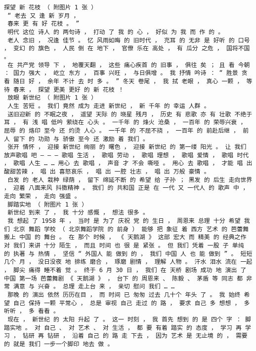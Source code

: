 \documentclass{article}
\begin{document}
\begin{Verbatim}[commandchars=\\\{\}]
 探望 新 花枝 （ 附图片 1 张 ） 
 “ 老去 又 逢 新 岁月 ， 
 春来 更 有 好 花枝 。 ” 
 明代 这位 诗人 的 两句诗 ， 打动 了 我 的 心 ， 好似 为 我 而 作 的 。 
 老人 念旧 ， 况逢 佳节 。 忆 风雨如晦 的 旧时代 ， 充耳 的 无非 是 好听 的 口号 ， 变幻 的 旗色 ， 人民 倒 在 地下 ， 官僚 乐在 高处 ， 有 瓜分 之危 ， 国将不国 。 
 在 共产党 领导 下 ， 地覆天翻 ， 这些 痛心疾首 的 旧事 ， 俱往 矣 ； 且 看 今朝 ： 国力 强大 ， 屹立 东方 ， 百事 兴旺 ， 与日俱增 。 我 抒情 吟诗 ： “ 胜景 贪看 随日 好 ， 余年 不计 去 时 多 。 ” 冬天 卷尾 ， 我 拭 老眼 ， 真心 一颗 ， 等待 春来 ， 探望 更美 更好 的 新 花枝 ！ 
 放眼 新世纪 （ 附图片 1 张 ） 
 人生 苦短 。 我们 竟然 成为 走进 新世纪 ， 新 千年 的 幸运 人群 。 
 送旧迎新 的 不眠之夜 ， 遥望 天际 的 晓星 残月 ， 历史 有 悲歌 亦 有 壮歌 不绝于耳 ， 有 浅 唱 低吟 萦绕在 心头 。 一千年 的 烽火 沧桑 ， 一百年 的 荣辱兴衰 ， 屈辱 的 烙印 至今 还 灼烫 人心 。 一千年 的 不屈不挠 ， 一百年 的 前赴后继 ， 前人 留下 的 功勋 与 骄傲 至今 还 激励 着 我们 。 
 张开 情怀 ， 迎接 新世纪 绚丽 的 曙色 ， 迎接 新世纪 的 第一缕 阳光 。 让 我们 放声歌唱 吧 — — — 歌唱 生活 ， 歌唱 劳动 ， 歌唱 理想 ， 歌唱 爱情 ， 歌唱 时代 ， 歌唱 人生 … … 用心 去 歌唱 ， 声音 才 不会 嘶哑 。 用心 去 歌唱 ， 才能 唱 出 酸甜苦辣 ， 唱 出 喜怒哀乐 ， 唱 出 一腔 壮志 ， 唱 出 万般 豪情 。 
 白发 的 老人 栽种 绿荫 ， 留下 绵延不断 的 希望 给 子孙 ； 黑发 的 后生 走向世界 ， 迎着 八面来风 抖擞精神 。 我们 的 共和国 正是 在 一代 又 一代人 的 歌声 中 ， 走向 繁荣 ， 走向 强盛 。 
 脚踏实地 （ 附图片 1 张 ） 
 新世纪 到来 了 ， 我 十分 感慨 ， 想法 很多 。 
 我 想起 了 1958 年 ， 当时 是 为了 庆祝 党 的 生日 ， 周恩来 总理 十分 希望 我们 北京 舞蹈 学校 （ 北京舞蹈学院 的 前身 ） 能够 把 象征 着 西方 艺术 的 芭蕾舞 搬上 中国 的 舞台 。 在 那个 时候 ， 《 天鹅湖 》 这部 宏大 而 精美 的 经典之作 对 我们 来讲 十分 陌生 ， 而且 时间 也 很 是 紧张 。 但 我们 凭着 一股 子 单纯 的 执著 与 热情 ， 坚信 “ 外国人 能 做到 的 ， 我们 中国 人 也 能 做到 ” 。 短短 几个 月 ， 没日没夜 地 排练 磨合 ， 琢磨 剧情 ， 理解 人物 。 汗水 泪水 流在 一起 ， 脚尖 痛得 睡不着 觉 。 终于 6 月 30 日 ， 我们 在 天桥 剧场 成功 地 演出 了 中国 第一场 芭蕾舞剧 《 天鹅湖 》 ， 台下 的 周恩来 、 陈毅 、 茅盾 等 同志 都 非常 满意 与 兴奋 。 总理 走上台 来 ， 亲切 慰问 我们 … … 
 那晚 的 演出 依然 历历在目 ， 而 时间 已 匆匆 过去 几十个 年头 了 。 我 始终 希望 自己 保持 一颗 平常心 ， 总是 审视 自己 走过 的 路 ， 要求 自己 多 想想 ， 多 听听 ， 多 看看 。 
 现在 ， 新世纪 的 太阳 升起 了 。 这一 时刻 ， 我 首先 想到 的 是 四个 字 ： 脚踏实地 。 对 自己 、 对 艺术 、 对 生活 ， 都 要 有着 踏实 的 态度 ， 学习 再 学习 ， 钻研 再 钻研 ， 沿着 自己 的 路 走 下去 ， 因为 艺术 是 无止境 的 ， 需要 的 就是 我们 一步一个脚印 地去 做 。 

\end{Verbatim}
\end{document}
